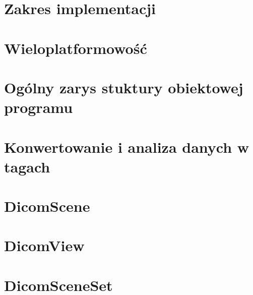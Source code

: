 

\section{Zakres implementacji}


\section{Wieloplatformowość}


\section{Ogólny zarys stuktury obiektowej programu}


\section{Konwertowanie i analiza danych w tagach}


\section{DicomScene}


\section{DicomView}


\section{DicomSceneSet}


